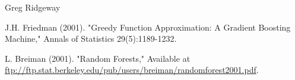 \begin{Author}\relax
Greg Ridgeway 
\end{Author}
\begin{References}\relax
J.H. Friedman (2001). "Greedy Function Approximation: A Gradient Boosting
Machine," Annals of Statistics 29(5):1189-1232.

L. Breiman (2001). "Random Forests," Available at \url{ftp://ftp.stat.berkeley.edu/pub/users/breiman/randomforest2001.pdf}.
\end{References}
\begin{SeeAlso}\relax
{}
\end{SeeAlso}


